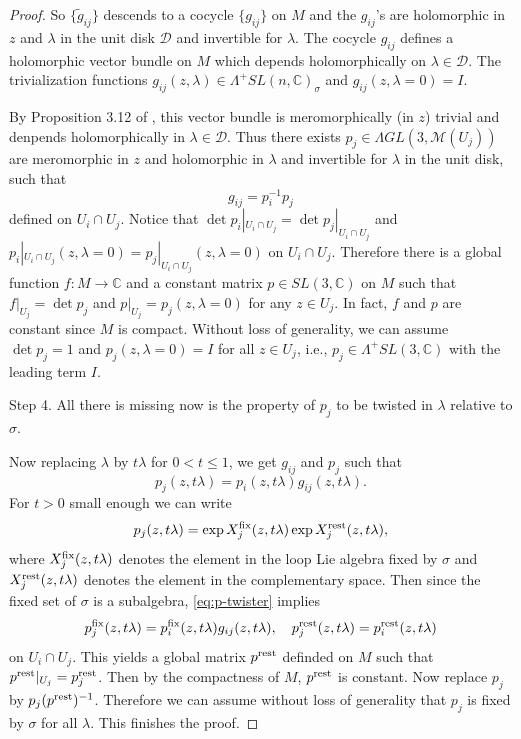 \documentclass[a4paper,11pt]{amsart}
\theoremstyle{definition}
\numberwithin{equation}{section}
\begin{document}
\begin{proof}
So $\{ \tilde{g}_{ij} \}$ descends to a cocycle   $\{g_{ij}\}$ on $M$ and the $g_{ij}$'s  are holomorphic in $z$ and $\lambda$  in the unit disk $\mathcal{D}$ and invertible for  $\lambda$.
The cocycle $g_{ij}$ defines a holomorphic vector bundle on $M$ which depends holomorphically on $\lambda\in \mathcal{D}$. The trivialization functions $g_{ij}(z,\lambda)\in \Lambda^+ SL(n,\mathbb{C})_{\sigma}$ and $g_{ij}(z, \lambda=0)=I$. 

By Proposition 3.12 of \cite{Rohrl}, this vector bundle is meromorphically (in $z$) trivial  and 
denpends holomorphically in $\lambda\in \mathcal{D}$. Thus there exists  $p_j\in \Lambda GL(3, \mathcal{M}(U_j))$ are meromorphic in $z$ and 
holomorphic  in $\lambda$ and invertible for $\lambda$ in the unit disk, such that
$$g_{ij}=p_i^{-1}p_j $$
defined on $U_i\cap U_j$.
Notice that $\det p_i|_{U_i\cap U_j}=\det p_j|_{U_i\cap U_j}$ and 
$p_i|_{U_i\cap U_j}(z,\lambda=0)=p_j|_{U_i\cap U_j}(z,\lambda=0)$ on $U_i\cap U_j$.
Therefore there is a global function $f: M\rightarrow \mathbb{C}$ and a constant matrix $p\in SL(3,\mathbb{C})$ on $M$ such that $f|_{U_j}=\det p_j$ and $p|_{U_j}=p_j(z,\lambda=0)$ for any $z\in U_j$. In fact, $f$ and $p$ are constant since $M$ is compact. 
Without loss of generality, we can assume $\det p_j=1$ and $p_j(z,\lambda=0)=I$ for all $z\in U_j$, i.e., 
$p_j \in \Lambda^+ SL(3,\mathbb{C})$ with the leading term $I$.


Step 4. All there is missing now is the property of  $p_j $ to be twisted in $\lambda$ relative to $\sigma$.
 
 Now replacing $\lambda$ by $t\lambda$ for $0<t \leq1$,  we get 
 $g_{ij}$ and $p_j$ such that 
  \begin{equation}\label{eq:p-twister}
 p_j(z,t\lambda)=p_i(z, t\lambda) g_{ij}(z, t\lambda).
 \end{equation}
  For $t>0$ small enough we can write
 $$p_j(z, t\lambda)=\exp X_j^{\rm{fix}}(z, t\lambda)\exp X^{\rm{rest}}_j(z, t\lambda),$$
 where $X_j^{\rm{fix}}(z, t\lambda)$ denotes the element in the loop Lie algebra fixed by $\sigma$ and $X^{\rm{rest}}_j(z, t\lambda)$ denotes the element in the complementary space. 
Then since the fixed set of $\sigma$ is a subalgebra, \eqref{eq:p-twister} implies 
$$p_j^{\rm{fix}}(z, t\lambda)=p_i^{\rm{fix}}(z, t\lambda) g_{ij}(z,t\lambda), \quad p_j^{\rm{rest}}(z, t\lambda)=p_i^{\rm{rest}}(z,t\lambda)$$
on $U_i\cap U_j$.
This yields a global matrix $p^{\rm{rest}}$ definded on $M$ such that 
$p^{\rm{rest}}|_{U_j}=p_j^{\rm{rest}}$. 
Then by the compactness of $M$, $p^{\rm{rest}}$ is constant. 
Now replace $p_j$ by $p_j (p^{\rm{rest}})^{-1}$.
Therefore we can assume without loss of generality that $p_j$ is fixed by $\sigma$ for all $\lambda$.
This finishes the proof.
\end{proof}
\end{document}
